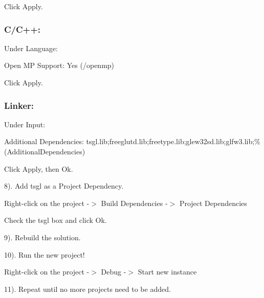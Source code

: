 Click {\ttfamily Apply}.

\subsubsection*{C/\-C++\-:}


\begin{DoxyItemize}
\item Under {\ttfamily Language\-:}
\begin{DoxyItemize}
\item {\ttfamily Open M\-P Support\-:} Yes (/openmp)
\end{DoxyItemize}
\end{DoxyItemize}

Click {\ttfamily Apply}.

\subsubsection*{Linker\-:}


\begin{DoxyItemize}
\item Under {\ttfamily Input\-:}
\begin{DoxyItemize}
\item {\ttfamily Additional Dependencies\-:} tsgl.\-lib;freeglutd.\-lib;freetype.\-lib;glew32sd.\-lib;glfw3.\-lib;\%(Additional\-Dependencies)
\end{DoxyItemize}
\end{DoxyItemize}

Click {\ttfamily Apply}, then {\ttfamily Ok}.

8). Add {\ttfamily tsgl} as a {\ttfamily Project Dependency}.


\begin{DoxyItemize}
\item {\ttfamily Right-\/click on the project -\/$>$ Build Dependencies -\/$>$ Project Dependencies}
\item Check the {\ttfamily tsgl} box and click {\ttfamily Ok}.
\end{DoxyItemize}

9). Rebuild the solution.

10). Run the new project!


\begin{DoxyItemize}
\item {\ttfamily Right-\/click on the project -\/$>$ Debug -\/$>$ Start new instance}
\end{DoxyItemize}

11). Repeat until no more projects need to be added.


